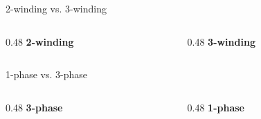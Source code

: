 \begin{frame}{2-winding vs. 3-winding}
  \begin{columns}[T,onlytextwidth]
    \begin{column}{0.48\textwidth}
      \centering
      \textbf{2-winding}\\[-0.2em]
      \begin{minipage}[c][0.62\textheight][c]{\linewidth}
        \centering
      \end{minipage}
      \begin{minipage}[b][0.1\textheight][c]{\linewidth}
        \centering
      \end{minipage}
    \end{column}
    \begin{column}{0.48\textwidth}
      \centering
      \textbf{3-winding}\\[-0.2em]
      \begin{minipage}[c][0.62\textheight][c]{\linewidth}
        \centering
      \end{minipage}
      \begin{minipage}[c][0.1\textheight][c]{\linewidth}
        \centering
      \end{minipage}      
    \end{column}
  \end{columns}
\end{frame}


\begin{frame}{1-phase vs. 3-phase}
  \begin{columns}[T,onlytextwidth]
    \begin{column}{0.48\textwidth}
      \centering
      \textbf{3-phase}\\[0.35em]
      \begin{minipage}[c][0.62\textheight][c]{\linewidth}
        \centering
      \end{minipage}
    \end{column}
    \begin{column}{0.48\textwidth}
      \centering
      \textbf{1-phase}\\[0.4em]
      \begin{minipage}[c][0.62\textheight][c]{\linewidth}
        \centering
      \end{minipage}
    \end{column}
  \end{columns}
\end{frame}

